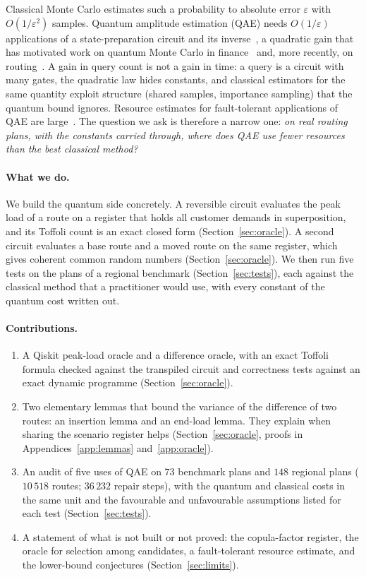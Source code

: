 \documentclass[pdflatex,sn-mathphys-num]{sn-jnl}
\theoremstyle{thmstyleone}
\theoremstyle{thmstyletwo}
\begin{document}
Classical Monte Carlo estimates such a probability to absolute error $\varepsilon$ with $O(1/\varepsilon^{2})$ samples. Quantum amplitude estimation (QAE) needs $O(1/\varepsilon)$ applications of a state-preparation circuit and its inverse~\cite{Brassard2002,Montanaro2015}, a quadratic gain that has motivated work on quantum Monte Carlo in finance~\cite{WoernerEgger2019,Gacon2020} and, more recently, on routing~\cite{WangFilipovska2026}. A gain in query count is not a gain in time: a query is a circuit with many gates, the quadratic law hides constants, and classical estimators for the same quantity exploit structure (shared samples, importance sampling) that the quantum bound ignores. Resource estimates for fault-tolerant applications of QAE are large~\cite{Babbush2021}. The question we ask is therefore a narrow one: \emph{on real routing plans, with the constants carried through, where does QAE use fewer resources than the best classical method?}

\paragraph{What we do.} We build the quantum side concretely. A reversible circuit evaluates the peak load of a route on a register that holds all customer demands in superposition, and its Toffoli count is an exact closed form (Section~\ref{sec:oracle}). A second circuit evaluates a base route and a moved route on the same register, which gives coherent common random numbers (Section~\ref{sec:oracle}). We then run five tests on the plans of a regional benchmark (Section~\ref{sec:tests}), each against the classical method that a practitioner would use, with every constant of the quantum cost written out.

\paragraph{Contributions.}
\begin{enumerate}
\item A Qiskit peak-load oracle and a difference oracle, with an exact Toffoli formula checked against the transpiled circuit and correctness tests against an exact dynamic programme (Section~\ref{sec:oracle}).
\item Two elementary lemmas that bound the variance of the difference of two routes: an insertion lemma and an end-load lemma. They explain when sharing the scenario register helps (Section~\ref{sec:oracle}, proofs in Appendices~\ref{app:lemmas} and~\ref{app:oracle}).
\item An audit of five uses of QAE on $73$ benchmark plans and $148$ regional plans ($10\,518$ routes; $36\,232$ repair steps), with the quantum and classical costs in the same unit and the favourable and unfavourable assumptions listed for each test (Section~\ref{sec:tests}).
\item A statement of what is not built or not proved: the copula-factor register, the oracle for selection among candidates, a fault-tolerant resource estimate, and the lower-bound conjectures (Section~\ref{sec:limits}).
\end{enumerate}
\end{document}
